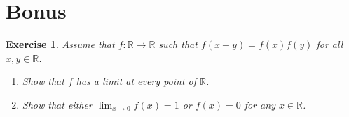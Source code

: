\documentclass[12pt]{article}
\newcommand{\bR}{\mathbb{R}}
\newcommand{\ra}{\rightarrow}
\theoremstyle{plain}
\newtheorem{exer}{\textbf{Exercise}}}
\theoremstyle{plain}
\begin{document}
\section{Bonus}
\begin{exer}
Assume that $f : \bR \ra \bR$ such that $f(x + y) = f(x) f(y)$ for all $x, y \in \bR$.
	\begin{enumerate}[label=\textbf{\alph*)}]
	\item Show that $f$ has a limit at every point of $\bR$.
	\item Show that either $\lim_{x \ra 0} f(x) = 1$ or $f(x) = 0$ for any $x \in \bR$.
	\end{enumerate}
\end{exer}
\end{document}
